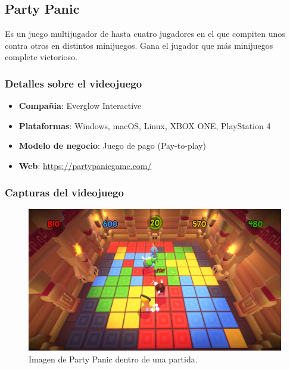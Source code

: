 \documentclass[12pt, spanish]{article}
\begin{document}
\subsection{Party Panic}

Es un juego multijugador de hasta cuatro jugadores en el que compiten unos contra otros en distintos minijuegos. Gana el jugador que más minijuegos complete victorioso.

\subsubsection{Detalles sobre el videojuego}

\begin{itemize}
	\item \textbf{Compañia}: Everglow Interactive
	\item \textbf{Plataformas}: Windows, macOS, Linux, XBOX ONE, PlayStation 4
	\item \textbf{Modelo de negocio}: Juego de pago (Pay-to-play)
	\item \textbf{Web}: \url{https://partypanicgame.com/}
\end{itemize}

\subsubsection{Capturas del videojuego}


\begin{figure}[H]
  \centering
   \includegraphics[width=\textwidth]{"competencia/pp_juego.jpg"}
	\caption{Imagen de Party Panic dentro de una partida.}
\end{figure}
\end{document}
